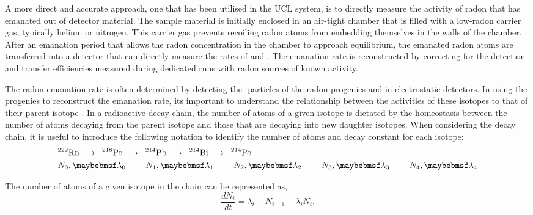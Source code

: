 A more direct and accurate approach, one that has been utilised in the UCL system, is to directly measure the activity of radon that has emanated out of detector material. The sample material is initially enclosed in an air-tight chamber that is filled with a low-radon carrier gas, typically helium or nitrogen. This carrier gas prevents recoiling radon atoms from embedding themselves in the walls of the chamber.  After an emanation period that allows the radon concentration in the chamber to approach equilibrium, the emanated radon atoms are transferred into a detector that can directly measure the rates of \PoTOE{} and \PoTOF{}. The emanation rate is reconstructed by correcting for the detection and transfer efficiencies measured during dedicated runs with radon sources of known activity. 

The radon emanation rate is often determined by detecting the \alpha-particles of the radon progenies \PoTOE{} and \PoTOF{} in electrostatic detectors. In using the progenies to reconstruct the emanation rate, its important to understand the relationship between the activities of these isotopes to that of their parent isotope \RnTTT{}. In a radioactive decay chain, the number of atoms of a given isotope is dictated by the homeostasis between the number of atoms decaying from the parent isotope and those that are decaying into new daughter isotopes. When considering the decay chain, it is useful to introduce the following notation to identify the number of atoms and decay constant for each isotope:
%
\begin{align*}
    &^{222}\MathText{Rn} \;\; \rightarrow \;\; ^{218}\MathText{Po} \;\; \rightarrow \;\; ^{214}\MathText{Pb} \;\; \rightarrow \;\; ^{214}\MathText{Bi} \;\; \rightarrow \;\; ^{214}\MathText{Po} \\
    &N_{0}, \lambda{}_{0} \,\,\,\,\,\,\,\,\,\,\,\,\,\,
    N_{1}, \lambda{}_{1} \,\,\,\,\,\,\,\,\,\,\,\,\,\,
    N_{2}, \lambda{}_{2} \,\,\,\,\,\,\,\,\,\,\,\,\,\,
    N_{3}, \lambda{}_{3} \,\,\,\,\,\,\,\,\,\,\,\,\,\,
    N_{4}, \lambda{}_{4} 
    \label{eq:radon_decay_chain}
\end{align*}
%

The number of atoms of a given isotope in the chain can be represented as, 
%
\begin{equation}
    \frac{dN_{i}}{dt} = \lambda_{i-1}N_{i-1} - \lambda_{i}N_{i}.
    \label{eq:isotopic_chance_in_chain}
\end{equation}
%

